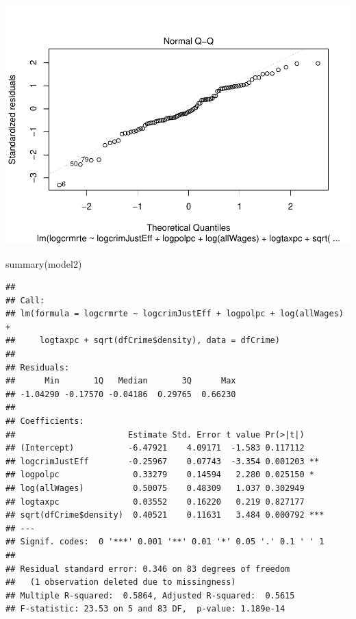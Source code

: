 \documentclass[]{article}
\newenvironment{Shaded}{}{}
\newcommand{\CommentTok}[1]{\textcolor[rgb]{0.00,0.50,0.00}{#1}}
\newcommand{\KeywordTok}[1]{\textcolor[rgb]{0.00,0.00,1.00}{#1}}
\newcommand{\NormalTok}[1]{#1}
\begin{document}
\includegraphics{Bagnard_Gaustad_Hartman_Leung_Lab_3_files/figure-latex/unnamed-chunk-90-1.pdf}

\begin{Shaded}
\end{Shaded}

\begin{Shaded}
\begin{Highlighting}[]
\KeywordTok{summary}\NormalTok{(model2)}
\end{Highlighting}
\end{Shaded}

\begin{verbatim}
## 
## Call:
## lm(formula = logcrmrte ~ logcrimJustEff + logpolpc + log(allWages) + 
##     logtaxpc + sqrt(dfCrime$density), data = dfCrime)
## 
## Residuals:
##      Min       1Q   Median       3Q      Max 
## -1.04290 -0.17570 -0.04186  0.29765  0.66230 
## 
## Coefficients:
##                       Estimate Std. Error t value Pr(>|t|)    
## (Intercept)           -6.47921    4.09171  -1.583 0.117112    
## logcrimJustEff        -0.25967    0.07743  -3.354 0.001203 ** 
## logpolpc               0.33279    0.14594   2.280 0.025150 *  
## log(allWages)          0.50075    0.48309   1.037 0.302949    
## logtaxpc               0.03552    0.16220   0.219 0.827177    
## sqrt(dfCrime$density)  0.40521    0.11631   3.484 0.000792 ***
## ---
## Signif. codes:  0 '***' 0.001 '**' 0.01 '*' 0.05 '.' 0.1 ' ' 1
## 
## Residual standard error: 0.346 on 83 degrees of freedom
##   (1 observation deleted due to missingness)
## Multiple R-squared:  0.5864, Adjusted R-squared:  0.5615 
## F-statistic: 23.53 on 5 and 83 DF,  p-value: 1.189e-14
\end{verbatim}
\end{document}
